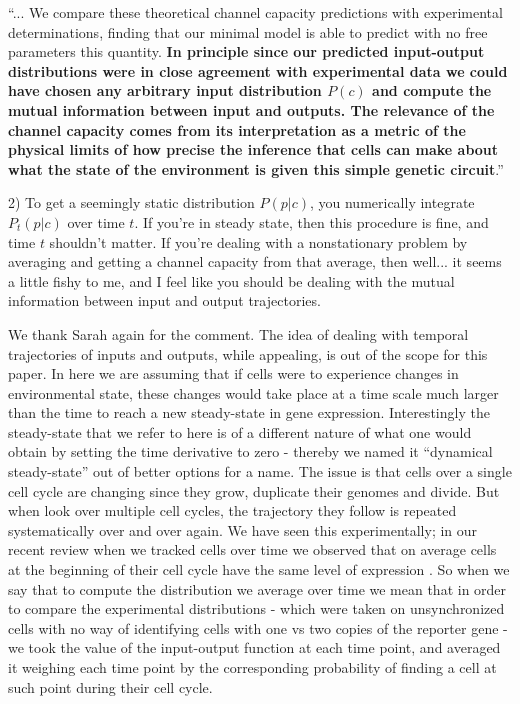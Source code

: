 ``... We compare these theoretical channel capacity predictions with
experimental determinations, finding that our minimal model is able to predict
with no free parameters this quantity. \textbf{In principle since our predicted
input-output distributions were in close agreement with experimental data we
could have chosen any arbitrary input distribution $P(c)$ and compute the mutual
information between input and outputs. The relevance of the channel capacity
comes from its interpretation as a metric of the physical limits of how precise
the inference that cells can make about what the state of the environment is
given this simple genetic circuit}.''

\begin{tcolorbox}
2)  To get a seemingly static distribution $P(p|c)$, you numerically integrate
$P_t(p|c)$ over time $t$.  If you're in steady state, then this procedure is
fine, and time $t$ shouldn't matter.  If you're dealing with a nonstationary
problem by averaging and getting a channel capacity from that average, then
well... it seems a little fishy to me, and I feel like you should be dealing
with the mutual information between input and output trajectories.
\end{tcolorbox}
We thank Sarah again for the comment. The idea of dealing with temporal
trajectories of inputs and outputs, while appealing, is out of the scope for
this paper. In here we are assuming that if cells were to experience changes
in environmental state, these changes would take place at a time scale much
larger than the time to reach a new steady-state in gene expression.
Interestingly the steady-state that we refer to here is of a different nature of
what one would obtain by setting the time derivative to zero - thereby we named
it ``dynamical steady-state'' out of better options for a name. The issue is
that cells over a single cell cycle are changing since they grow, duplicate
their genomes and divide. But when look over multiple cell cycles, the
trajectory they follow is repeated systematically over and over again. We have
seen this experimentally; in our recent review when we tracked cells over time
we observed that on average cells at the beginning of their cell cycle have the
same level of expression \cite{Phillips2019}. So when we say that to compute the
distribution we average over time we mean that in order to compare the
experimental distributions - which were taken on unsynchronized cells with no
way of identifying cells with one vs two copies of the reporter gene - we took
the value of the input-output function at each time point, and averaged it
weighing each time point by the corresponding probability of finding a cell at
such point during their cell cycle.

